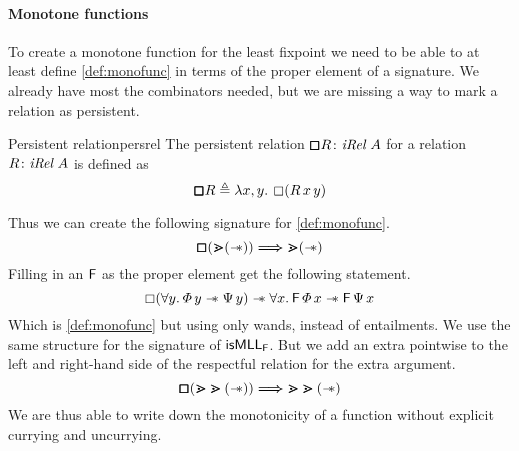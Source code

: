\documentclass[thesis.tex]{subfiles}
\begin{document}
\paragraph*{Monotone functions}
To create a monotone function for the least fixpoint we need to be able to at least define \cref{def:monofunc} in terms of the proper element of a signature. We already have most the combinators needed, but we are missing a way to mark a relation as persistent.
\begin{definition}{Persistent relation}{persrel}
  The persistent relation $\persrel\rel\colon\Rel\ \sigax$ for a relation $\rel\colon\Rel\ \sigax$ is defined as
  \[\persrel\rel \eqdef \Lam\var,\varB. \always (\rel\,\var\,\varB)\]
\end{definition}
Thus we can create the following signature for \cref{def:monofunc}.
\[\pmb{\mathop{\boxempty}} (\bm{\gtrdot} (\mathrel{-\!\!\ast})) \mathrel{\bm{\Longrightarrow}} \bm{\gtrdot} (\mathrel{-\!\!\ast})\]
Filling in an $\textsf{\upshape F}$ as the proper element get the following statement.
\[ \always(\All \varB. \pred\,\varB \wand \predB\,\varB) \wand \All \var. \hopred\,\pred\,\var \wand \hopred\,\predB\,\var \]
Which is \cref{def:monofunc} but using only wands, instead of entailments. We use the same structure for the signature of $\textsf{\upshape isMLL}_{\textsf{\upshape F}}$. But we add an extra pointwise to the left and right-hand side of the respectful relation for the extra argument.
\[\pmb{\mathop{\boxempty}} (\bm{\gtrdot}\bm{\gtrdot} (\mathrel{-\!\!\ast})) \mathrel{\bm{\Longrightarrow}} \bm{\gtrdot}\bm{\gtrdot} (\mathrel{-\!\!\ast})\]
We are thus able to write down the monotonicity of a function without explicit currying and uncurrying.
\end{document}
